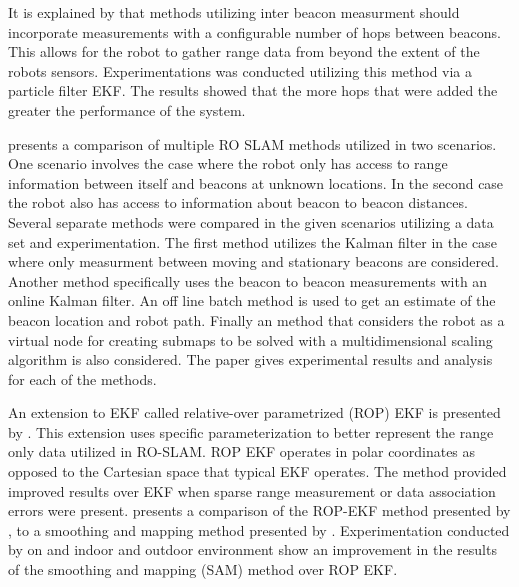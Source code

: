 \documentclass[conference]{IEEEtran}
\begin{document}
	\FloatBarrier
	
	
	
	It is explained by \cite{Torres-Gonzalez2015} that methods utilizing inter beacon measurment should incorporate measurements with a configurable number of hops between beacons. This allows for the robot to gather range data from beyond the extent of the robots sensors. Experimentations was conducted utilizing this method via a particle filter EKF. The results showed that the more hops that were added the greater the performance of the system. 
	
	
	
	\cite{Djugash2006} presents a comparison of multiple RO SLAM methods utilized in two scenarios. One scenario involves the case where the robot only has access to range information between itself and beacons at unknown locations. In the second case the robot also has access to information about beacon to beacon distances. Several separate methods were compared in the given scenarios utilizing a data set and experimentation. The first method utilizes the Kalman filter in the case where only measurment between moving and stationary beacons are considered. Another method specifically uses the beacon to beacon measurements with an online Kalman filter. An off line batch method is used to get an estimate of the beacon location and robot path. Finally an method that considers the robot as a virtual node for creating submaps to be solved with a multidimensional scaling algorithm is also considered. The paper gives experimental results and analysis for each of the methods. 
	
	
	
	
	
	
	
	
	
	An extension to EKF called relative-over parametrized (ROP) EKF is presented by \cite{Djugash2008}. This extension uses specific parameterization to  better represent the range only data utilized in RO-SLAM. ROP EKF operates in polar coordinates as opposed to the Cartesian space that typical EKF operates. The method provided improved results over EKF when sparse range measurement or data association errors were present. \cite{Herranz2014} presents a comparison of the ROP-EKF method presented by \cite{Djugash2008}, to a smoothing and mapping method presented by \cite{Dellaert2006}. Experimentation conducted by \cite{Herranz2014} on and indoor and outdoor environment show an improvement in the results of the smoothing and mapping (SAM) method over ROP EKF.
	
\end{document}
